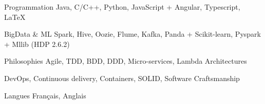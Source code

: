 


\begin{cvskills}


\cvskill
{\scriptsize Programmation} %
{\scriptsize Java, C/C++, Python, JavaScript + Angular, Typescript, LaTeX} %

\cvskill
{\scriptsize BigData \& ML} %
{\scriptsize Spark, Hive, Oozie, Flume, Kafka, Panda + Scikit-learn, Pyspark + Mllib (HDP 2.6.2) } %

\cvskill
{\scriptsize Philosophies} %
{\scriptsize Agile, TDD, BDD, DDD, Micro-services, Lambda Architectures} %

\cvskill
{} %
{\scriptsize DevOps, Continuous delivery, Containers, SOLID, Software Craftsmanship} %


\cvskill
{\scriptsize Langues} %
{\scriptsize Français, Anglais} %

\end{cvskills}